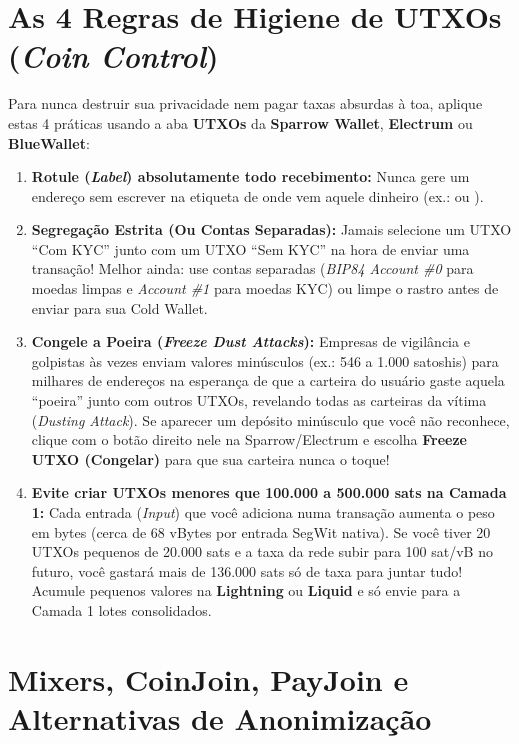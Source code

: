 \documentclass{pousadaguide}
\begin{document}
\section{As 4 Regras de Higiene de UTXOs (\emph{Coin Control})}

Para nunca destruir sua privacidade nem pagar taxas absurdas à toa, aplique estas 4 práticas usando a aba \textbf{UTXOs} da \textbf{Sparrow Wallet}, \textbf{Electrum} ou \textbf{BlueWallet}:

\begin{enumerate}
  \item \textbf{Rotule (\emph{Label}) absolutamente todo recebimento:} Nunca gere um endereço sem escrever na etiqueta de onde vem aquele dinheiro (ex.:  ou ).
  \item \textbf{Segregação Estrita (Ou Contas Separadas):} Jamais selecione um UTXO ``Com KYC'' junto com um UTXO ``Sem KYC'' na hora de enviar uma transação! Melhor ainda: use contas separadas (\emph{BIP84 Account \#0} para moedas limpas e \emph{Account \#1} para moedas KYC) ou limpe o rastro antes de enviar para sua Cold Wallet.
  \item \textbf{Congele a Poeira (\emph{Freeze Dust Attacks}):} Empresas de vigilância e golpistas às vezes enviam valores minúsculos (ex.: 546 a 1.000 satoshis) para milhares de endereços na esperança de que a carteira do usuário gaste aquela ``poeira'' junto com outros UTXOs, revelando todas as carteiras da vítima (\emph{Dusting Attack}). Se aparecer um depósito minúsculo que você não reconhece, clique com o botão direito nele na Sparrow/Electrum e escolha \textbf{Freeze UTXO (Congelar)} para que sua carteira nunca o toque!
  \item \textbf{Evite criar UTXOs menores que 100.000 a 500.000 sats na Camada 1:} Cada entrada (\emph{Input}) que você adiciona numa transação aumenta o peso em bytes (cerca de 68 vBytes por entrada SegWit nativa). Se você tiver 20 UTXOs pequenos de 20.000 sats e a taxa da rede subir para 100 sat/vB no futuro, você gastará mais de 136.000 sats só de taxa para juntar tudo! Acumule pequenos valores na \textbf{Lightning} ou \textbf{Liquid} e só envie para a Camada 1 lotes consolidados.
\end{enumerate}

\clearpage
\section{Mixers, CoinJoin, PayJoin e Alternativas de Anonimização}
\end{document}
